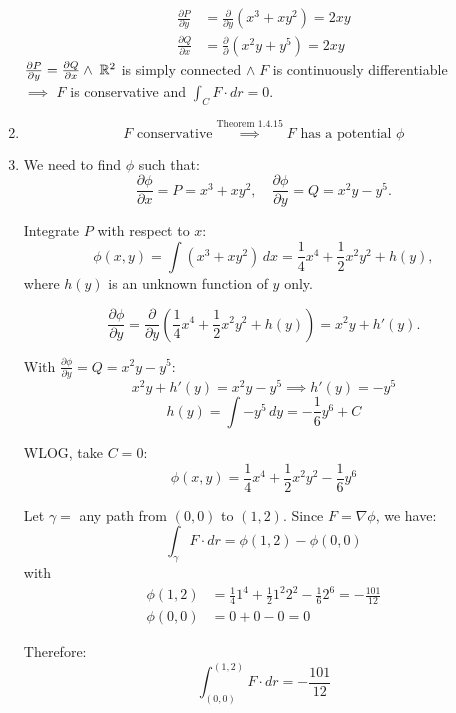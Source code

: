 \begin{solution}
\begin{enumerate}
		      $$
			      \begin{aligned}
				      \frac{\partial P}{\partial y} & = \frac{\partial}{\partial y} (x^3 + xy^2) = 2xy \\
				      \frac{\partial Q}{\partial x} & = \frac{\partial}{\partial } (x^2 y + y^5) = 2xy
			      \end{aligned}
		      $$
		      $\frac{\partial P}{\partial y} = \frac{\partial Q}{\partial x} \wedge \; \mathbb{R}^2$ is simply connected $ \wedge \; F$ is continuously differentiable \\
		      $\implies$ $F$ is conservative and $\int_C F \cdot dr = 0$.

		\item
		      $$
			      F \text{ conservative} \overset{\text{Theorem 1.4.15}}{\implies} F \text{ has a potential } \phi
		      $$

		\item
		      We need to find $\phi$ such that:
		      $$
			      \frac{\partial \phi}{\partial x} = P = x^3 + x y^2, \quad \frac{\partial \phi}{\partial y} = Q = x^2 y - y^5.
		      $$

		      Integrate $P$ with respect to $x$:
		      $$
			      \phi(x,y) = \int (x^3 + x y^2)\, dx = \frac{1}{4}x^4 + \frac{1}{2}x^2 y^2 + h(y),
		      $$
		      where $h(y)$ is an unknown function of $y$ only.

		      $$
			      \frac{\partial \phi}{\partial y} = \frac{\partial}{\partial y} \left( \frac{1}{4}x^4 + \frac{1}{2}x^2 y^2 + h(y) \right) = x^2 y + h'(y).
		      $$

		      With $\frac{\partial \phi}{\partial y} = Q = x^2 y - y^5$:
		      $$
			      x^2 y + h'(y) = x^2 y - y^5 \implies h'(y) = -y^5
		      $$
		      $$
			      h(y) = \int -y^5\, dy = -\frac{1}{6} y^6 + C
		      $$

		      WLOG, take $C = 0$:
		      $$
			      \phi(x,y) = \frac{1}{4}x^4 + \frac{1}{2}x^2 y^2 - \frac{1}{6} y^6
		      $$

		      Let $\gamma = $ any path from $(0,0)$ to $(1,2)$. Since $F = \nabla \phi$, we have:
		      $$
			      \int_\gamma F \cdot dr = \phi(1,2) - \phi(0,0)
		      $$
		      with
		      $$
			      \begin{aligned}
				      \phi(1,2) & = \frac{1}{4} 1^4 + \frac{1}{2} 1^2 2^2 - \frac{1}{6} 2^6 = -\frac{101}{12} \\
				      \phi(0,0) & = 0 + 0 - 0 = 0
			      \end{aligned}
		      $$

		      Therefore:
		      $$
			      \int_{(0,0)}^{(1,2)} F \cdot dr = -\frac{101}{12}
		      $$
	\end{enumerate}
\end{solution}
